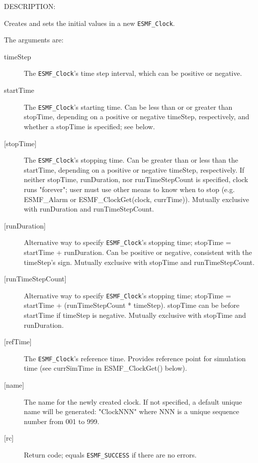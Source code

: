 {\sf DESCRIPTION:\\ }


       Creates and sets the initial values in a new {\tt ESMF\_Clock}.
  
       The arguments are:
       \begin{description}
       \item[timeStep]
            The {\tt ESMF\_Clock}'s time step interval, which can be
            positive or negative.
       \item[startTime]
            The {\tt ESMF\_Clock}'s starting time.  Can be less than or
            or greater than stopTime, depending on a positive or negative
            timeStep, respectively, and whether a stopTime is specified;
            see below.
       \item[{[stopTime]}]
            The {\tt ESMF\_Clock}'s stopping time.  Can be greater than or
            less than the startTime, depending on a positive or negative
            timeStep, respectively.  If neither stopTime, runDuration, nor
            runTimeStepCount is specified, clock runs "forever"; user must
            use other means to know when to stop (e.g. ESMF\_Alarm or
            ESMF\_ClockGet(clock, currTime)).  Mutually exclusive with
            runDuration and runTimeStepCount.
       \item[{[runDuration]}]
            Alternative way to specify {\tt ESMF\_Clock}'s stopping time;
               stopTime = startTime + runDuration.
            Can be positive or negative, consistent with the timeStep's sign.
            Mutually exclusive with stopTime and runTimeStepCount.
       \item[{[runTimeStepCount]}]
            Alternative way to specify {\tt ESMF\_Clock}'s stopping time;
               stopTime = startTime + (runTimeStepCount * timeStep).
            stopTime can be before startTime if timeStep is negative.
            Mutually exclusive with stopTime and runDuration.
       \item[{[refTime]}]
            The {\tt ESMF\_Clock}'s reference time.  Provides reference point
            for simulation time (see currSimTime in ESMF\_ClockGet() below).
       \item[{[name]}]
            The name for the newly created clock.  If not specified, a
            default unique name will be generated: "ClockNNN" where NNN
            is a unique sequence number from 001 to 999.
       \item[{[rc]}]
            Return code; equals {\tt ESMF\_SUCCESS} if there are no errors.
       \end{description}
   
